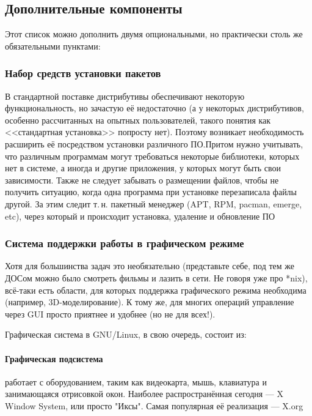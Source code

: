 \subsection{Дополнительные компоненты}\label{base:os:structure:additional}
Этот список можно дополнить двумя опциональными, но практически столь же обязательными пунктами:

\subsubsection{Набор средств установки пакетов}\label{base:os:structure:additional:packagemanager}
В стандартной поставке дистрибутивы обеспечивают некоторую функциональность, но зачастую её недостаточно (а у некоторых дистрибутивов, особенно рассчитанных на опытных пользователей, такого понятия как <<стандартная установка>> попросту нет). Поэтому возникает необходимость расширить её посредством установки различного ПО.Притом нужно учитывать, что различным программам могут требоваться некоторые библиотеки, которых нет в системе, а иногда и другие приложения, у которых могут быть свои зависимости. Также не следует забывать о размещении файлов, чтобы не получить ситуацию, когда одна программа при установке перезаписала файлы другой. За этим следит т.\,н. пакетный менеджер (APT, RPM, pacman, emerge, etc), через который и происходит установка, удаление и обновление ПО

\subsubsection{Система поддержки работы в графическом режиме}\label{base:os:structure:additional:gui}
Хотя для большинства задач это необязательно (представьте себе, под тем же ДОСом можно было смотреть фильмы и лазить в сети. Не говоря уже про *nix), всё-таки есть области, для которых поддержка графического режима необходима (например, 3D-моделирование). К тому же, для многих операций управление через GUI просто приятнее и удобнее (но не для всех!).

Графическая система в GNU/Linux, в свою очередь, состоит из:

\paragraph{Графическая подсистема} работает с оборудованием, таким как видеокарта, мышь, клавиатура и занимающаяся отрисовкой окон. Наиболее распространённая сегодня --- X Window System, или просто "Иксы". Самая популярная её реализация --- X.org

